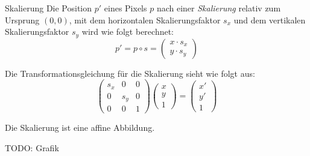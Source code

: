 \begin{defi}{Skalierung}
    Die Position $p'$ eines Pixels $p$ nach einer \emph{Skalierung} relativ zum Ursprung $(0, 0)$, mit dem horizontalen Skalierungsfaktor $s_x$ und dem vertikalen Skalierungsfaktor $s_y$ wird wie folgt berechnet:
    \[
        p' = p \circ s =
        \begin{pmatrix}
            x \cdot s_x \\
            y \cdot s_y
        \end{pmatrix}
    \]

    Die Transformationsgleichung für die Skalierung sieht wie folgt aus:
    \[
        \begin{pmatrix}
            s_x & 0   & 0 \\
            0   & s_y & 0 \\
            0   & 0   & 1
        \end{pmatrix}
        \begin{pmatrix}
            x \\ y \\ 1
        \end{pmatrix}
        =
        \begin{pmatrix}
            x' \\ y' \\ 1
        \end{pmatrix}
    \]

    Die Skalierung ist eine affine Abbildung.

    TODO: Grafik
\end{defi}

